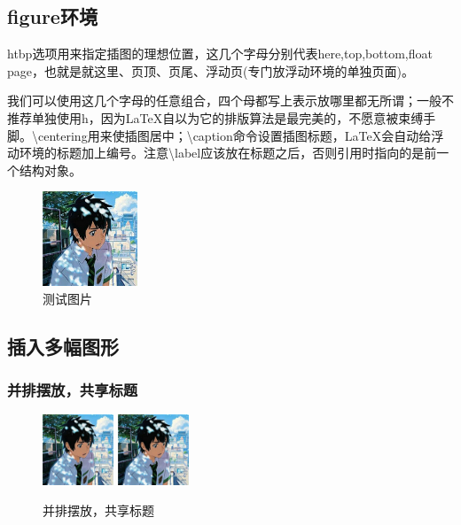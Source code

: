 \documentclass[UTF8]{article}
\begin{document}
\subsection{figure环境}
htbp选项用来指定插图的理想位置，这几个字母分别代表here,top,bottom,float page，也就是就这里、页顶、页尾、浮动页(专门放浮动环境的单独页面)。

我们可以使用这几个字母的任意组合，四个母都写上表示放哪里都无所谓；一般不推荐单独使用h，因为\LaTeX 自以为它的排版算法是最完美的，不愿意被束缚手脚。\textbackslash centering用来使插图居中；\textbackslash caption命令设置插图标题，\LaTeX 会自动给浮动环境的标题加上编号。注意\textbackslash label应该放在标题之后，否则引用时指向的是前一个结构对象。
\begin{figure}[htbp]
\centering
\includegraphics[width=80pt]{test.jpg}
\caption{测试图片}
\label{fig:myphoto}
\end{figure}

\subsection{插入多幅图形}
\subsubsection{并排摆放，共享标题}
\begin{figure}[htbp]
\centering
\includegraphics[width=60pt]{test.jpg}
\includegraphics[width=60pt]{test.jpg}
\caption{并排摆放，共享标题}
\end{figure}
\end{document}
